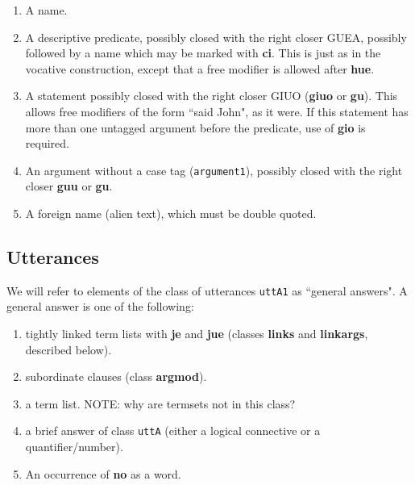 \documentclass[12pt]{book}
\begin{document}
\begin{enumerate}


\item  A name.

\item  A descriptive predicate, possibly closed with the right closer GUEA, possibly followed by a name which may be marked with {\bf ci}.  This is just as in the vocative construction, except that a free modifier is allowed after {\bf hue}.

\item  A statement possibly closed with the right closer GIUO ({\bf giuo} or {\bf gu}).  This allows free modifiers of the form ``said John", as it were.  If this statement has more than one
untagged argument before the predicate, use of {\bf gio} is required.

\item An argument without a case tag ({\tt argument1}), possibly closed with the right closer {\bf guu} or {\bf gu}.

\item  A foreign name (alien text), which must be double quoted.

\end{enumerate}

\subsection{Utterances}

We will refer to elements of the class of utterances {\tt uttA1} as ``general answers".   A general answer is one of the following:

\begin{enumerate}



\item  tightly linked term lists with {\bf je} and {\bf jue} (classes {\bf links} and {\bf linkargs}, described below).

\item  subordinate clauses (class {\bf argmod}).

\item a term list.  NOTE:  why are termsets not in this class?

\item a brief answer of class {\tt uttA} (either a logical connective or a quantifier/number).

\item An occurrence of {\bf no} as a word.

\end{enumerate}
\end{document}
